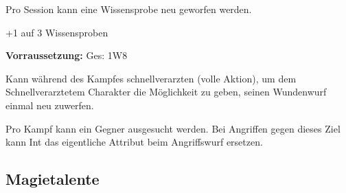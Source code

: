 \documentclass[../../Heldenanleitung2]{subfiles}
\begin{document}
\begin{multicols}{2}

\begin{tcolorbox}[title={Wissender},colbacktitle=brown, coltitle=black]    
   Pro Session kann eine Wissensprobe neu geworfen werden.
\end{tcolorbox}

\begin{tcolorbox}[title={Allgemeinwissen},colbacktitle=brown, coltitle=black]    
   +1 auf 3 Wissensproben
\end{tcolorbox}



\begin{tcolorbox}[title={Feldarzt},colbacktitle=brown, coltitle=black]
	\textbf{Vorraussetzung:} Ges: 1W8
	\vspace{0.2cm}
	
   Kann während des Kampfes schnellverarzten (volle Aktion), um dem Schnellverarztetem Charakter die Möglichkeit zu geben, seinen \glqq Wundenwurf\grqq{} einmal neu zuwerfen.
\end{tcolorbox}

\begin{tcolorbox}[title={Gegner analysieren},colbacktitle=brown, coltitle=black]    
   Pro Kampf kann ein Gegner ausgesucht werden. Bei Angriffen gegen dieses Ziel kann Int das eigentliche Attribut beim Angriffswurf ersetzen.
\end{tcolorbox}

\end{multicols}

\subsection{Magietalente}
\end{document}

